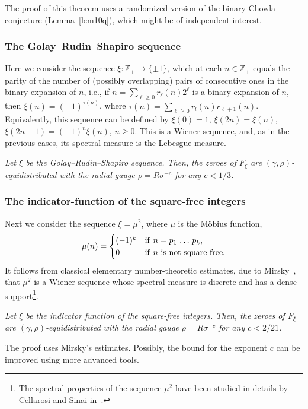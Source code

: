 \documentclass[11pt]{amsart}
\numberwithin{equation}{section}
\newcommand{\bZ}{\mathbb Z}
\begin{document}
The proof of this theorem uses a randomized version of the binary Chowla conjecture (Lemma~\ref{lem10q}), which might be of independent interest.

\subsubsection{The Golay--Rudin--Shapiro sequence}
Here we consider the sequence $\xi\colon \bZ_+\to \{\pm 1\}$, which at each $n\in \bZ_+$
equals the parity of the number of (possibly overlapping) pairs of consecutive
ones in the binary expansion of $n$, i.e., if $n=\sum_{\ell\ge 0} r_\ell (n) 2^\ell$
is a binary expansion of $n$, then $\xi (n) = (-1)^{\tau (n)}$, where
$\tau (n) = \sum_{\ell\ge 0} r_l(n)r_{\ell+1}(n)$. Equivalently, this sequence
can be defined by $\xi(0)=1$, $\xi(2n)=\xi(n)$, $\xi(2n+1)=(-1)^n \xi(n)$, $n\ge 0$.
This is a Wiener sequence, and,
as in the previous cases, its spectral measure is the Lebesgue measure.

\medskip{}
{\em Let $\xi$ be the Golay--Rudin--Shapiro sequence.
Then, the zeroes of $F_\xi$ are $(\gamma, \rho)$-equidistributed 
with the radial gauge $\rho=R\sigma^{-c}$ for any $c<1/3$.
}\medskip

\subsubsection{The indicator-function of the square-free integers}
Next we consider the sequence
$\xi =\mu^2$, where $\mu$ is the M\"obius function,
\[
\mu (n) =
\begin{cases}
(-1)^k &{\rm if\ } n=p_1\,\ldots\, p_k, \\
0 &{\rm if\ } n \textrm{\ is not square-free}.
\end{cases}
\]
It follows from classical elementary number-theoretic estimates, due to Mir\-sky~\cite{Mirsky},
that $\mu^2$ is a Wiener sequence whose spectral measure is discrete and has a dense support\footnote{
The spectral properties of the sequence $\mu^2$ have been studied in details by Cellarosi and Sinai in~\cite{CS}.}.

\medskip{}
{\em Let $\xi$ be the indicator function of the square-free integers.
Then, the zeroes of $F_\xi$ are $(\gamma, \rho)$-equidistributed 
with the radial gauge $\rho=R\sigma^{-c}$ for any $c<2/21$.
}
\medskip

The proof uses Mirsky's estimates.
Possibly, the bound for the exponent $c$ can be improved using more advanced tools.
\end{document}
